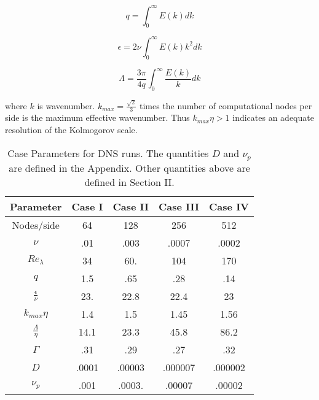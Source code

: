\documentclass[aps,pra,twocolumn,groupedaddress,showkeys,showpacs,floatfix]{revtex4}
\begin{document}
\begin{equation}
q = \int_{0}^{\infty}E(k)dk  
\end{equation}

\begin{equation}
\epsilon = 2\nu\int_{0}^{\infty}E(k)k^2dk 
\end{equation}

\begin{equation}
\Lambda = \frac{3\pi}{4q}\int_{0}^{\infty}\frac{E(k)}{k}dk  
\end{equation}

where $k$ is wavenumber.
$k_{max} = \frac{\sqrt{2}}{3}$ times the number of computational nodes per side is the 
maximum effective wavenumber. Thus $k_{max}\eta > 1$ indicates an adequate resolution of
the Kolmogorov scale.  




\begin{table}[h]
\begin{center}
\begin{tabular}{|c|c|c|c|c|}
\hline
Parameter & Case I & Case II & Case III & Case IV \\
\hline
Nodes/side            & 64       & 128      & 256       &   512  \\
$\nu$                 & .01      & .003     & .0007     &  .0002 \\
$Re_{\lambda}$        & 34       & 60.      & 104       &   170  \\
$q$                   & 1.5      & .65      & .28       &   .14  \\
$\frac{\epsilon}{\nu}$ & 23.      & 22.8  & 22.4   &   23   \\
$ k_{max}\eta$         & 1.4      & 1.5      & 1.45      &   1.56  \\
$\frac{\Lambda}{\eta}$ & 14.1 & 23.3 & 45.8 & 86.2 \\
$\Gamma$                & .31      & .29      & .27       &  .32   \\ 
$D$                   &  .0001   & .00003   & .000007   &  .000002 \\ 
$\nu_{p}$             &  .001    & .0003.   & .00007    &  .00002  \\
\hline
\end{tabular}
\caption{\label{tab1}Case Parameters for DNS runs. The quantities $D$ and $\nu_p$
are defined in the Appendix. Other quantities above are defined in Section II.}



\end{center}
\end{table}
\end{document}
